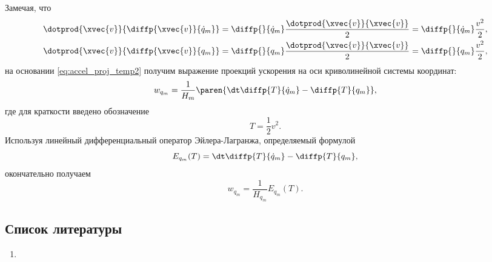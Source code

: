 Замечая, что
\begin{equation*}
  \begin{gathered}
    \dotprod{\xvec{v}}{\diffp{\xvec{v}}{{\dot{q}_m}}} =
      \diffp{}{{\dot{q}_m}} \frac{\dotprod{\xvec{v}}{\xvec{v}}}{2} =
      \diffp{}{{\dot{q}_m}} \frac{v^2}{2}, \\
    \dotprod{\xvec{v}}{\diffp{\xvec{v}}{{q_m}}} =
      \diffp{}{{q_m}} \frac{\dotprod{\xvec{v}}{\xvec{v}}}{2} =
      \diffp{}{{q_m}} \frac{v^2}{2},
  \end{gathered}
\end{equation*}
на основании \autoref{eq:accel_proj_temp2} получим выражение проекций ускорения
на оси криволинейной системы координат:
\begin{equation}
  w_{q_m} = \frac{1}{H_m} \paren{\dt \diffp{T}{{\dot{q}_m}} - \diffp{T}{{q_m}}},
\end{equation}
где для краткости введено обозначение
\begin{equation}
  T = \frac{1}{2} v^2.
\end{equation}
Используя линейный дифференциальный оператор Эйлера-Лагранжа, определяемый
формулой
\begin{equation}
  E_{q_m}(T) = \dt \diffp{T}{{\dot{q}_m}} - \diffp{T}{{q_m}},
\end{equation}
окончательно получаем
\begin{equation}
  \label{eq:accel_proj}
  w_{q_m} = \frac{1}{H_{q_m}} E_{q_m}(T).
\end{equation}

\subsection{Список литературы}
\begin{enumerate}
  \item \cite{lourie}
\end{enumerate}

